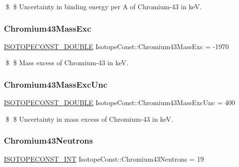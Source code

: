 \$ \$ Uncertainty in binding energy per A of Chromium-\/43 in keV. \mbox{\label{group___isotope_const-_chromium-_cr43_ga56d7d183e7acb0dca74873fc41f1053d}} 
\subsubsection{\texorpdfstring{Chromium43\+Mass\+Exc}{Chromium43MassExc}}
{\footnotesize\ttfamily \mbox{\hyperlink{group___isotope_const-_macros_ga8f45a7272ce02c0b4c65c44636ed719a}{I\+S\+O\+T\+O\+P\+E\+C\+O\+N\+S\+T\+\_\+\+D\+O\+U\+B\+LE}} Isotope\+Const\+::\+Chromium43\+Mass\+Exc = -\/1970}

\$ \$ Mass excess of Chromium-\/43 in keV. \mbox{\label{group___isotope_const-_chromium-_cr43_ga2df01909efe88771808cf50fa68c3ea6}} 
\subsubsection{\texorpdfstring{Chromium43\+Mass\+Exc\+Unc}{Chromium43MassExcUnc}}
{\footnotesize\ttfamily \mbox{\hyperlink{group___isotope_const-_macros_ga8f45a7272ce02c0b4c65c44636ed719a}{I\+S\+O\+T\+O\+P\+E\+C\+O\+N\+S\+T\+\_\+\+D\+O\+U\+B\+LE}} Isotope\+Const\+::\+Chromium43\+Mass\+Exc\+Unc = 400}

\$ \$ Uncertainty in mass excess of Chromium-\/43 in keV. \mbox{\label{group___isotope_const-_chromium-_cr43_ga7756f253a36b23c5e03d108841156df5}} 
\subsubsection{\texorpdfstring{Chromium43\+Neutrons}{Chromium43Neutrons}}
{\footnotesize\ttfamily \mbox{\hyperlink{group___isotope_const-_macros_ga5f18360b3e99483a35c32d789e62621c}{I\+S\+O\+T\+O\+P\+E\+C\+O\+N\+S\+T\+\_\+\+I\+NT}} Isotope\+Const\+::\+Chromium43\+Neutrons = 19}

